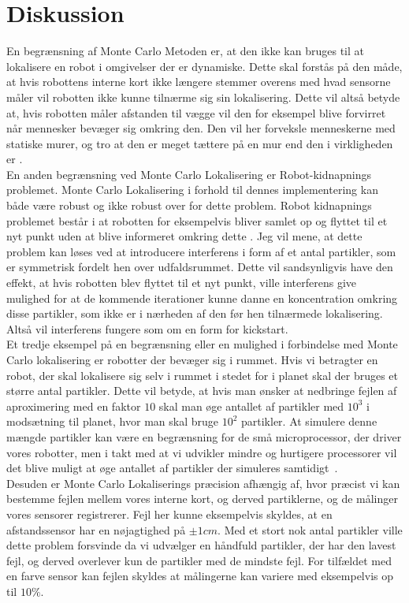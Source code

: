 \documentclass[../../SRP.tex]{subfiles}
\begin{document}
\chapter{Diskussion}

En begrænsning af Monte Carlo Metoden er, at den ikke kan bruges til at lokalisere en robot i omgivelser der er dynamiske. Dette skal forstås på den måde, at hvis robottens interne kort ikke længere stemmer overens med hvad sensorne måler vil robotten ikke kunne tilnærme sig sin lokalisering. Dette vil altså betyde at, hvis robotten måler afstanden til vægge vil den for eksempel blive forvirret når mennesker bevæger sig omkring den. Den vil her forveksle menneskerne med statiske murer, og tro at den er meget tættere på en mur end den i virkligheden er \cite{ML}. \\

En anden begrænsning ved Monte Carlo Lokalisering er Robot-kidnapnings problemet.
Monte Carlo Lokalisering i forhold til dennes implementering kan både være robust og ikke robust over for dette problem. Robot kidnapnings problemet består i at robotten for eksempelvis bliver samlet op og flyttet til et nyt punkt uden at blive informeret omkring dette \cite{ML}. Jeg vil mene, at dette problem kan løses ved at introducere interferens i form af et antal partikler, som er symmetrisk fordelt hen over udfaldsrummet. Dette vil sandsynligvis have den effekt, at hvis robotten blev flyttet til et nyt punkt, ville interferens give mulighed for at de kommende iterationer kunne danne en koncentration omkring disse partikler, som ikke er i nærheden af den før hen tilnærmede lokalisering. Altså vil interferens fungere som om en form for kickstart. \\

Et tredje eksempel på en begrænsning eller en mulighed i forbindelse med Monte Carlo lokalisering er robotter der bevæger sig i rummet. Hvis vi betragter en robot, der skal lokalisere sig selv i rummet i stedet for i planet skal der bruges et større antal partikler. Dette vil betyde, at hvis man ønsker at nedbringe fejlen af aproximering med en faktor $10$ skal man øge antallet af partikler med $10^3$ i modsætning til planet, hvor man skal bruge $10^2$ partikler. At simulere denne mængde partikler kan være en begrænsning for de små microprocessor, der driver vores robotter, men i takt med at vi udvikler mindre og hurtigere processorer vil det blive muligt at øge antallet af partikler der simuleres samtidigt \cite{ML}. \\

Desuden er Monte Carlo Lokaliserings præcision afhængig af, hvor præcist vi kan bestemme fejlen mellem vores interne kort, og derved partiklerne, og de målinger vores sensorer registrerer. Fejl her kunne eksempelvis skyldes, at en afstandssensor har en nøjagtighed på $\pm1cm$. Med et stort nok antal partikler ville dette problem forsvinde da vi udvælger en håndfuld partikler, der har den lavest fejl, og derved overlever kun de partikler med de mindste fejl. For tilfældet med en farve sensor kan fejlen skyldes at målingerne kan variere med eksempelvis op til $10\%$.
\end{document}
